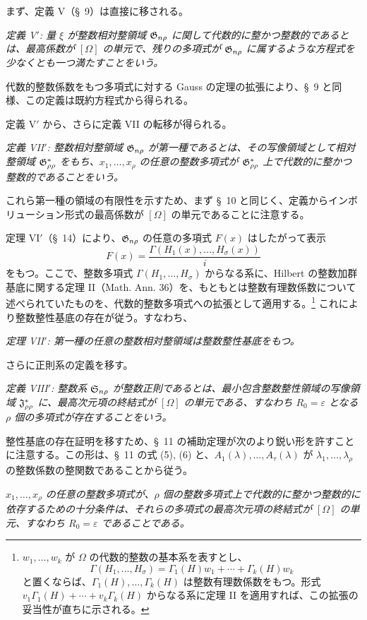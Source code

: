 \documentclass[11pt]{article}
\newcommand{\eps}{\varepsilon}
\begin{document}
まず、定義 V（\S\ 9）は直接に移される。

\emph{定義 V$'$: 量 $\xi$ が整数相対整領域 $\mathfrak{G}_{n\rho}$ に関して代数的に整かつ整数的であるとは、最高係数が $[\Omega]$ の単元で、残りの多項式が $\mathfrak{G}_{n\rho}$ に属するような方程式を少なくとも一つ満たすことをいう。}

代数的整数係数をもつ多項式に対する Gauss の定理の拡張により、\S\ 9 と同様、この定義は既約方程式から得られる。

定義 V$'$ から、さらに定義 VII の転移が得られる。

\emph{定義 VII$'$: 整数相対整領域 $\mathfrak{G}_{n\rho}$ が第一種であるとは、その写像領域として相対整領域 $\mathfrak{G}^*_{\rho\rho}$ をもち、$x_1,\ldots,x_\rho$ の任意の整数多項式が $\mathfrak{G}^*_{\rho\rho}$ 上で代数的に整かつ整数的であることをいう。}

これら第一種の領域の有限性を示すため、まず \S\ 10 と同じく、定義からインボリューション形式の最高係数が $[\Omega]$ の単元であることに注意する。

定理 VI$'$（\S\ 14）により、$\mathfrak{G}_{n\rho}$ の任意の多項式 $F(x)$ はしたがって表示
\[
  F(x)=\frac{\Gamma(H_1(x),\ldots,H_\sigma(x))}{i}
\]
をもつ。ここで、整数多項式 $\Gamma(H_1,\ldots,H_\sigma)$ からなる系に、Hilbert の整数加群基底に関する定理 II（Math. Ann. 36）を、もともとは整数有理数係数について述べられていたものを、代数的整数多項式への拡張として適用する。\footnote{$w_1,\ldots,w_k$ が $\Omega$ の代数的整数の基本系を表すとし、
\[
  \Gamma(H_1,\ldots,H_\sigma)=\Gamma_1(H)w_1+\cdots+\Gamma_k(H)w_k
\]
と置くならば、$\Gamma_1(H),\ldots,\Gamma_k(H)$ は整数有理数係数をもつ。形式 $v_1\Gamma_1(H)+\cdots+v_k\Gamma_k(H)$ からなる系に定理 II を適用すれば、この拡張の妥当性が直ちに示される。} これにより整数整性基底の存在が従う。すなわち、

\emph{定理 VII$'$: 第一種の任意の整数相対整領域は整数整性基底をもつ。}

さらに正則系の定義を移す。

\emph{定義 VIII$'$: 整数系 $\mathfrak{S}_{n\rho}$ が整数正則であるとは、最小包含整数整性領域の写像領域 $\mathfrak{J}^*_{\rho\rho}$ に、最高次元項の終結式が $[\Omega]$ の単元である、すなわち $R_0=\eps$ となる $\rho$ 個の多項式が存在することをいう。}

整性基底の存在証明を移すため、\S\ 11 の補助定理が次のより鋭い形を許すことに注意する。この形は、\S\ 11 の式 (5), (6) と、$A_1(\lambda),\ldots,A_\tau(\lambda)$ が $\lambda_1,\ldots,\lambda_\rho$ の整数係数の整関数であることから従う。

\emph{$x_1,\ldots,x_\rho$ の任意の整数多項式が、$\rho$ 個の整数多項式上で代数的に整かつ整数的に依存するための十分条件は、それらの多項式の最高次元項の終結式が $[\Omega]$ の単元、すなわち $R_0=\eps$ であることである。}
\end{document}
